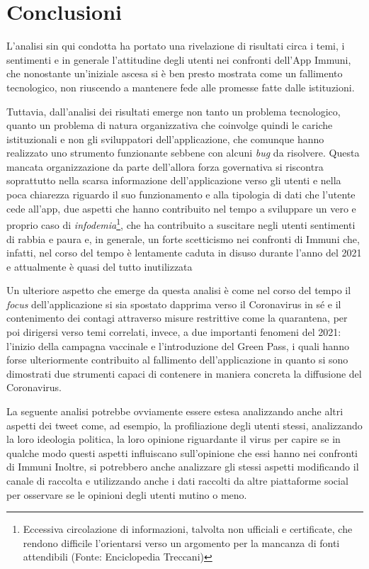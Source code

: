 \chapter*{Conclusioni}

L'analisi sin qui condotta ha portato una rivelazione di risultati circa i temi, i sentimenti e in generale l'attitudine degli utenti nei confronti dell'App Immuni, che nonostante un'iniziale ascesa si è ben presto mostrata come un fallimento tecnologico, non riuscendo a mantenere fede alle promesse fatte dalle istituzioni. 

Tuttavia, dall'analisi dei risultati emerge non tanto un problema tecnologico, quanto un problema di natura organizzativa che coinvolge quindi le cariche istituzionali e non gli sviluppatori dell'applicazione, che comunque hanno realizzato uno strumento funzionante sebbene con alcuni \textit{bug} da risolvere. 
Questa mancata organizzazione da parte dell'allora forza governativa si riscontra soprattutto nella scarsa informazione dell'applicazione verso gli utenti e nella poca chiarezza riguardo il suo funzionamento e alla tipologia di dati che l'utente cede all'app, due aspetti che hanno contribuito nel tempo a sviluppare un vero e proprio caso di \textit{infodemia}\footnote{Eccessiva circolazione di informazioni, talvolta non ufficiali e certificate, che rendono difficile  
l'orientarsi verso un argomento per la mancanza di fonti attendibili (Fonte: Enciclopedia Treccani)}, che ha contribuito a suscitare negli utenti sentimenti di rabbia e paura e, in generale, un forte scetticismo nei confronti di Immuni che, infatti, nel corso del tempo è lentamente caduta in disuso durante l'anno del 2021 e attualmente è quasi del tutto inutilizzata

Un ulteriore aspetto che emerge da questa analisi è come nel corso del tempo il \textit{focus} dell'applicazione si sia spostato dapprima verso il Coronavirus in sé e il contenimento dei contagi attraverso misure restrittive come la quarantena, per poi dirigersi verso temi correlati, invece, a due importanti fenomeni del 2021: l'inizio della campagna vaccinale e l'introduzione del Green Pass, i quali hanno forse ulteriormente contribuito al fallimento dell'applicazione in quanto si sono dimostrati due strumenti capaci di contenere in maniera concreta la diffusione del Coronavirus.

La seguente analisi potrebbe ovviamente essere estesa analizzando anche altri aspetti dei tweet come, ad esempio, la profiliazione degli utenti stessi, analizzando la loro ideologia politica, la loro opinione riguardante il virus per capire se in qualche modo questi aspetti influiscano sull'opinione che essi hanno nei confronti di Immuni 
Inoltre, si potrebbero anche analizzare gli stessi aspetti modificando il canale di raccolta e utilizzando anche i dati raccolti da altre piattaforme social per osservare se le opinioni degli utenti mutino o meno.
